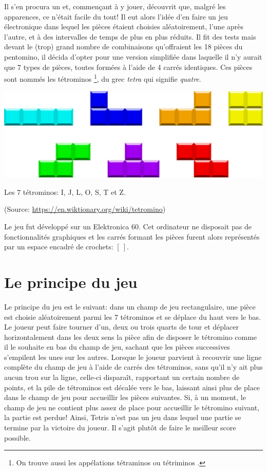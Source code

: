 Il s'en procura un et, commençant à y jouer, découvrit que, malgré les apparences, ce n'était facile du tout! Il eut alors l'idée d'en faire un jeu électronique dans lequel les pièces étaient choisies aléatoirement, l'une après l'autre, et à des intervalles de temps de plus en plus réduits. Il fit des tests mais devant le (trop) grand nombre de combinaisons qu'offraient les 18 pièces du pentomino, il décida d'opter pour une version simplifiée dans laquelle il n'y aurait que 7 types de pièces, toutes formées à l'aide de 4 carrés identiques. Ces pièces sont nommés les \og tétrominos \fg{}\footnote{On trouve aussi les appélations \og tétraminos \fg{} ou \og tétriminos \fg{}.}, du grec \textit{tetra} qui signifie \textit{quatre}. 

\begin{center}
	\includegraphics[scale=0.3]{../media/tetromino.png}
	
	\medskip
	
	Les 7 tétrominos: I, J, L, O, S, T et Z.
	
	(Source: \url{https://en.wiktionary.org/wiki/tetromino})
\end{center}

Le jeu fut développé sur un Elektronica 60. Cet ordinateur ne disposait pas de fonctionnalités graphiques et les carrés formant les pièces furent alors représentés par un espace encadré de crochets: $[~]$.

\section{Le principe du jeu}

Le principe du jeu est le suivant: dans un champ de jeu rectangulaire, une pièce est choisie aléatoirement parmi les 7 tétrominos et se déplace du haut vers le bas. Le joueur peut faire tourner d'un, deux ou trois quarts de tour et déplacer horizontalement dans les deux sens la pièce afin de disposer le tétromino comme il le souhaite en bas du champ de jeu, sachant que les pièces successives s'empilent les unes sur les autres. Lorsque le joueur parvient à recouvrir une ligne complète du champ de jeu à l'aide de carrés des tétrominos, sans qu'il n'y ait plus aucun trou sur la ligne, celle-ci disparaît, rapportant un certain nombre de points, et la pile de tétrominos est décalée vers le bas, laissant ainsi plus de place dans le champ de jeu pour accueillir les pièces suivantes. Si, à un moment, le champ de jeu ne contient plus assez de place pour accueillir le tétromino suivant, la partie est perdue! Ainsi, Tetris n'est pas un jeu dans lequel une partie se termine par la victoire du joueur. Il s'agit plutôt de faire le meilleur score possible.

